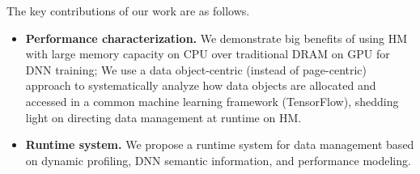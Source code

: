 The key contributions of our work are as follows.
\begin{itemize}[leftmargin=*]
    \item \textbf{Performance characterization.} \textcolor{check}{We demonstrate big benefits of using HM with large memory capacity on CPU over traditional DRAM on GPU for DNN training; We use a data object-centric (instead of page-centric) approach to systematically analyze how data objects are allocated and accessed in a common machine learning framework (TensorFlow), shedding light on directing data management at runtime on HM.}   
    
    
    


\item \textbf{Runtime system.} \textcolor{check}{We propose a runtime system for data management based on dynamic profiling, DNN semantic information, and performance modeling.}





\end{itemize}

